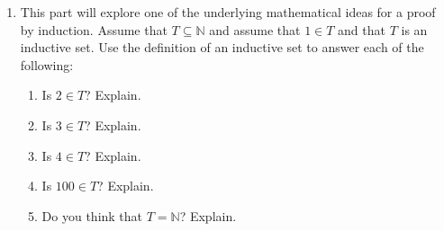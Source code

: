 \begin{previewactivity}
\begin{enumerate}
\begin{multicols}{2}
\begin{enumerate}
\item The set of integers, $\mathbb{Z}$
\item The set of odd natural numbers.
\end{enumerate}
\end{multicols}

\item This part will explore one of the underlying mathematical ideas for a proof by induction.  Assume that  $T \subseteq \mathbb{N}$ and assume that  $1 \in T$ and that  $T$ is an inductive set.  Use the definition of an inductive set to answer each of the following:  \label{PA:propertyofN6}

\begin{multicols}{2}
\begin{enumerate}
  \item Is  $2 \in T$?  Explain.
  \item Is  $3 \in T$?  Explain.
  \item Is  $4 \in T$?  Explain.
  \item Is  $100 \in T$?  Explain.
  \item Do you think that  $T = \mathbb{N}$?  Explain.
\end{enumerate}
\end{multicols}

\end{enumerate}
\end{previewactivity}
\hbreak
\endinput
